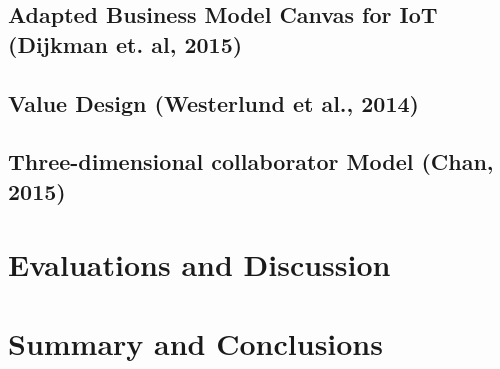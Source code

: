 
	\subsection{Adapted Business Model Canvas for IoT (Dijkman et. al, 2015)}

	\subsection{Value Design (Westerlund et al., 2014)}

	\subsection{Three-dimensional collaborator Model (Chan, 2015)}

		

\section{Evaluations and Discussion}
\label{sec:eval}

\section{Summary and Conclusions}
\label{sec:summary}
	
